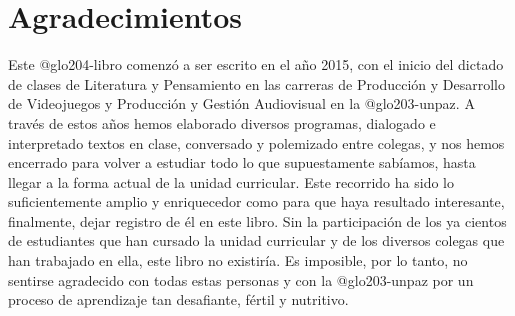 \newif\ifPDF%
\newif\ifBNPDF%
\newif\ifEPUB%
\newif\ifHTML%
\newif\ifODT%

 \PDFtrue





\ifODT
\usepackage[unicode,hyperindex=true]{hyperref}
\else
	\ifPDF
	\usepackage[hyphenation,homeoarchy,draft,homeoarchywordcolor=yellow,homeoarchycharcolor=yellow]{impnattypo}
	\usepackage[allcolors=magenta,colorlinks]{hyperref}
	\usepackage{hyperxmp}
	
	\else
		\ifBNPDF
		\usepackage[cam,width=18truecm,height=25.5truecm,center]{crop}
		\usepackage[hidelinks]{hyperref}
		\usepackage{hyperxmp}
		
		\else
			\ifEPUB
			\usepackage[hyperindex=true,allcolors=magenta,colorlinks]{hyperref}
			\fi
		\fi
	\fi
\fi


\frontmatter

\ifEPUB%
	\ifdefined\HCode
	\phantomsection
	\addcontentsline{toc}{section}{Portada}
	\coverimage{./media/cover.png}
	\clearpage
	\fi
\fi

\ifPDF

\else
	\ifBNPDF
	
	\fi
\fi

\tableofcontents

\chapter{Agradecimientos}

Este \gls{@glo204-libro} comenzó a ser escrito en el año 2015, con el inicio del dictado de clases de Literatura y Pensamiento en las carreras de Producción y Desarrollo de Videojuegos y Producción y Gestión Audiovisual en la \gls{@glo203-unpaz}. A través de estos años hemos elaborado diversos programas, dialogado e interpretado textos en clase, conversado y polemizado entre colegas, y nos hemos encerrado para volver a estudiar todo lo que supuestamente sabíamos, hasta llegar a la forma actual de la unidad curricular. Este recorrido ha sido lo suficientemente amplio y enriquecedor como para que haya resultado interesante, finalmente, dejar registro de él en este libro. Sin la participación de los ya cientos de estudiantes que han cursado la unidad curricular y de los diversos colegas que han trabajado en ella, este libro no existiría. Es imposible, por lo tanto, no sentirse agradecido con todas estas personas y con la \gls{@glo203-unpaz} por un proceso de aprendizaje tan desafiante, fértil y nutritivo.

